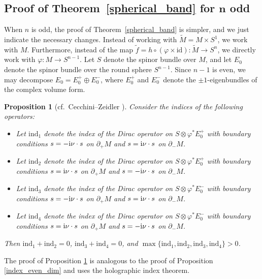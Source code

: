 \documentclass[11pt]{article}
\numberwithin{equation}{section}
\numberwithin{equation}{section}
\newtheorem{Proposition}[Theorem]{Proposition}
 { \theoremstyle{definition}
\newtheorem{Definition}[Theorem]{Definition}
\newtheorem{Note}[Theorem]{Note}
\newtheorem{Example}[Theorem]{Example}
\newtheorem{Remark}[Theorem]{Remark} }
\newcommand{\id}{\mathrm{id}}
\begin{document}
\subsection[Proof of Theorem~\ref{spherical_band} for n odd]{Proof of Theorem~\ref{spherical_band} for $\boldsymbol{n}$ odd}

When $n$ is odd, the proof of Theorem~\ref{spherical_band} is simpler, and we just indicate the necessary changes.
Instead of working with $\tilde{M} = M \times S^1$, we work with $M$.
Furthermore, instead of the map $\tilde{f} = h \circ (\varphi \times \id)\colon \tilde{M} \to S^n$, we directly work with $\varphi\colon M \to S^{n-1}$.
Let $S$ denote the spinor bundle over $M$, and let $E_0$ denote the spinor bundle over the round sphere $S^{n-1}$.
Since $n-1$ is even, we may decompose $E_0 = E_0^+ \oplus E_0^-$, where $E_0^+$ and $E_0^-$ denote the $\pm 1$-eigenbundles of the complex volume form.

\begin{Proposition}[cf.\ Cecchini--Zeidler \cite{Cecchini-Zeidler}]
\label{index_odd_dim}
Consider the indices of the following operators:
\begin{itemize}\itemsep=0pt
\item Let $\mathrm{ind}_1$ denote the index of the Dirac operator on $S \otimes \varphi^* E_0^+$ with boundary conditions $s = -{\rm i} \nu \cdot s$ on $\partial_+ M$ and $s = {\rm i} \nu \cdot s$ on $\partial_- M$.
\item Let $\mathrm{ind}_2$ denote the index of the Dirac operator on $S \otimes \varphi^* E_0^+$ with boundary conditions $s = {\rm i} \nu \cdot s$ on $\partial_+ M$ and $s = -{\rm i} \nu \cdot s$ on $\partial_- M$.
\item Let $\mathrm{ind}_3$ denote the index of the Dirac operator on $S \otimes \varphi^* E_0^-$ with boundary conditions $s = -{\rm i} \nu \cdot s$ on $\partial_+ M$ and $s = {\rm i} \nu \cdot s$ on $\partial_- M$.
\item Let $\mathrm{ind}_4$ denote the index of the Dirac operator on $S \otimes \varphi^* E_0^-$ with boundary conditions $s = {\rm i} \nu \cdot s$ on $\partial_+ M$ and $s = -{\rm i} \nu \cdot s$ on $\partial_- M$.
\end{itemize}
Then $\mathrm{ind}_1+\mathrm{ind}_2=0$, $\mathrm{ind}_3+\mathrm{ind}_4=0$, and $\max \{\mathrm{ind}_1,\mathrm{ind}_2, \mathrm{ind}_3, \mathrm{ind}_4\} > 0$.
\end{Proposition}

The proof of Proposition \ref{index_odd_dim} is analogous to the proof of Proposition \ref{index_even_dim} and uses the holographic index theorem.
\end{document}
